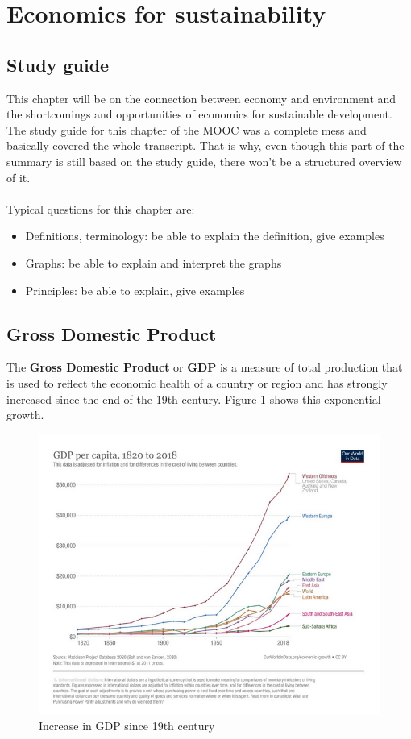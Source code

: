 \documentclass[../summary.tex]{subfiles}
\begin{document}
	
	\section{Economics for sustainability}
	
	\subsection{Study guide}
	
	This chapter will be on the connection between economy and environment and the shortcomings and opportunities of economics for sustainable development. The study guide for this chapter of the MOOC was a complete mess and basically covered the whole transcript. That is why, even though this part of the summary is still based on the study guide, there won't be a structured overview of it.
	\\\\
	Typical questions for this chapter are:
	\begin{itemize}
		\item Definitions, terminology: be able to explain the definition, give examples
		\item Graphs: be able to explain and interpret the graphs
		\item Principles: be able to explain, give examples
	\end{itemize}
	
	\subsection{Gross Domestic Product}
	
	The \textbf{Gross Domestic Product} or \textbf{GDP} is a measure of total production that is used to reflect the economic health of a country or region and has strongly increased since the end of the 19th century. Figure \ref{fig:GDP} shows this exponential growth.
		
	\begin{figure}[htbp]
		\centering
		\includegraphics[width=1\linewidth]{images/10-GDP-increase.png}
		\caption{Increase in GDP since 19th century}
		\label{fig:GDP}
	\end{figure}
	
\end{document}
